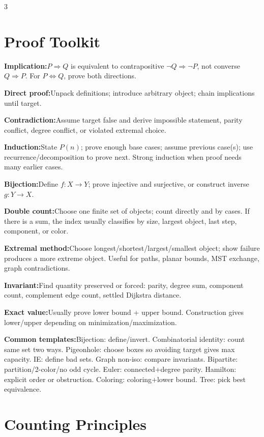\documentclass[10pt]{article}
\newenvironment{cheatitems}{\par\vspace{-1pt}}{\par\vspace{-1pt}}
\newcommand{\cheatrow}[2]{\par\noindent\textbf{#1:}\enspace #2\par}
\begin{document}
\begin{multicols}{3}
\vspace*{-0.45em}
\scriptsize
\raggedcolumns

\section*{Proof Toolkit}
\begin{cheatitems}
\cheatrow{Implication}{$P\Rightarrow Q$ is equivalent to contrapositive $\neg Q\Rightarrow\neg P$, not converse $Q\Rightarrow P$. For $P\Leftrightarrow Q$, prove both directions.}
\cheatrow{Direct proof}{Unpack definitions; introduce arbitrary object; chain implications until target.}
\cheatrow{Contradiction}{Assume target false and derive impossible statement, parity conflict, degree conflict, or violated extremal choice.}
\cheatrow{Induction}{State $P(n)$; prove enough base cases; assume previous case(s); use recurrence/decomposition to prove next. Strong induction when proof needs many earlier cases.}
\cheatrow{Bijection}{Define $f:X\to Y$; prove injective and surjective, or construct inverse $g:Y\to X$.}
\cheatrow{Double count}{Choose one finite set of objects; count directly and by cases. If there is a sum, the index usually classifies by size, largest object, last step, component, or color.}
\cheatrow{Extremal method}{Choose longest/shortest/largest/smallest object; show failure produces a more extreme object. Useful for paths, planar bounds, MST exchange, graph contradictions.}
\cheatrow{Invariant}{Find quantity preserved or forced: parity, degree sum, component count, complement edge count, settled Dijkstra distance.}
\cheatrow{Exact value}{Usually prove lower bound + upper bound. Construction gives lower/upper depending on minimization/maximization.}
\cheatrow{Common templates}{Bijection: define/invert. Combinatorial identity: count same set two ways. Pigeonhole: choose boxes so avoiding target gives max capacity. IE: define bad sets. Graph non-iso: compare invariants. Bipartite: partition/2-color/no odd cycle. Euler: connected+degree parity. Hamilton: explicit order or obstruction. Coloring: coloring+lower bound. Tree: pick best equivalence.}
\end{cheatitems}

\section*{Counting Principles}

\end{multicols}
\end{document}
